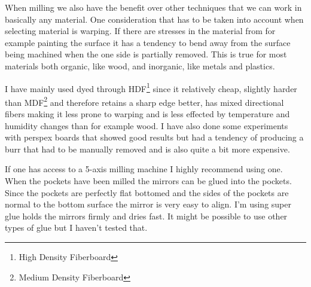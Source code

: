 \documentclass{article}
\begin{document}
When milling we also have the benefit over other techniques that 
we can work in basically any material. One consideration that has to be taken into account
when selecting material is warping. If there are stresses in the material
from for example painting the surface it has a tendency to bend away
from the surface being machined when the one side is partially removed.
This is true for most materials both organic, like wood, and inorganic, like metals and plastics.

I have mainly used dyed through HDF\footnote{High Density Fiberboard}
since it relatively cheap, slightly harder than MDF\footnote{Medium Density Fiberboard} and therefore
retains a sharp edge better, has mixed directional fibers making it
less prone to warping and is less effected by temperature and humidity
changes than for example wood. I have also done some experiments with
perspex boards that showed good results but had a tendency of producing
a burr that had to be manually removed and is also quite a bit more
expensive.

If one has access to a 5-axis milling machine I highly recommend using
one. When the pockets have been milled the mirrors can be glued into the
pockets. Since the pockets are perfectly flat bottomed and the sides of
the pockets are normal to the bottom surface the mirror is very easy to
align. I'm using super glue holds the mirrors firmly and dries fast. It
might be possible to use other types of glue but I haven't tested that.
\end{document}
